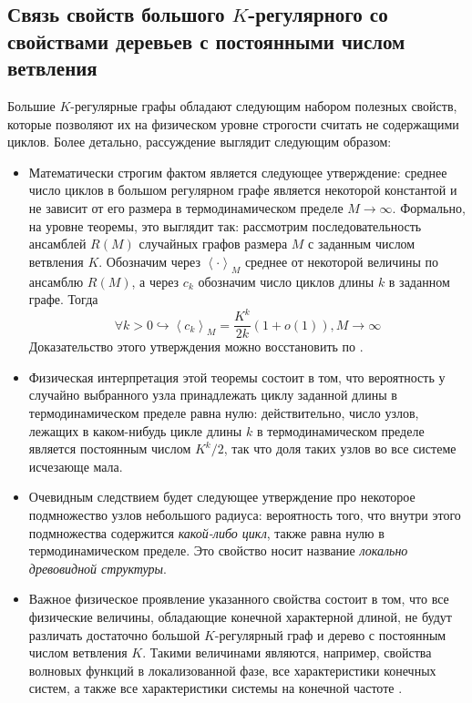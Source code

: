\subsection{Связь свойств большого $K$-регулярного со свойствами деревьев с постоянными числом ветвления}
Большие $K$-регулярные графы обладают следующим набором полезных свойств, которые позволяют их на физическом уровне строгости считать не содержащими циклов. Более детально, рассуждение выглядит следующим образом:
\begin{itemize}
	\item Математически строгим фактом является следующее утверждение: среднее число циклов в большом регулярном графе является некоторой константой и не зависит от его размера в термодинамическом пределе $M \rightarrow \infty$. Формально, на уровне теоремы, это выглядит так: рассмотрим последовательность ансамблей $R(M)$ случайных графов размера $M$ с заданным числом ветвления $K$. Обозначим через $\left\langle \cdot \right\rangle_M$ среднее от некоторой величины по ансамблю $R(M)$, а через $c_k$ обозначим число циклов длины $k$ в заданном графе. Тогда
	\begin{equation}
		\label{eq:Theorem_average_number_of_cycles}
		\forall k > 0 \hookrightarrow \left\langle c_k \right\rangle_M = \frac{K^k}{2k} \left(1 + o(1) \right), M \rightarrow \infty 
	\end{equation}
	Доказательство этого утверждения можно восстановить по \cite{McKay_1981}. 
	
	\item Физическая интерпретация этой теоремы состоит в том, что вероятность у случайно выбранного узла принадлежать циклу заданной длины в термодинамическом пределе равна нулю: действительно, число узлов, лежащих в каком-нибудь цикле длины $k$ в термодинамическом пределе является постоянным числом $K^k / 2$, так что доля таких узлов во все системе исчезающе мала.
	
	\item Очевидным следствием будет следующее утверждение про некоторое подмножество узлов небольшого радиуса: вероятность того, что внутри этого подмножества содержится \textit{какой-либо цикл}, также равна нулю в термодинамическом пределе. Это свойство носит название \textit{локально древовидной структуры}.
	
	\item Важное физическое проявление указанного свойства состоит в том, что все физические величины, обладающие конечной характерной длиной, не будут различать достаточно большой $K$-регулярный граф и дерево с постоянным числом ветвления $K$. Такими величинами являются, например, свойства волновых функций в локализованной фазе, все характеристики конечных систем, а также все характеристики системы на конечной частоте \cite{Tikhonov_2016}.
\end{itemize}
